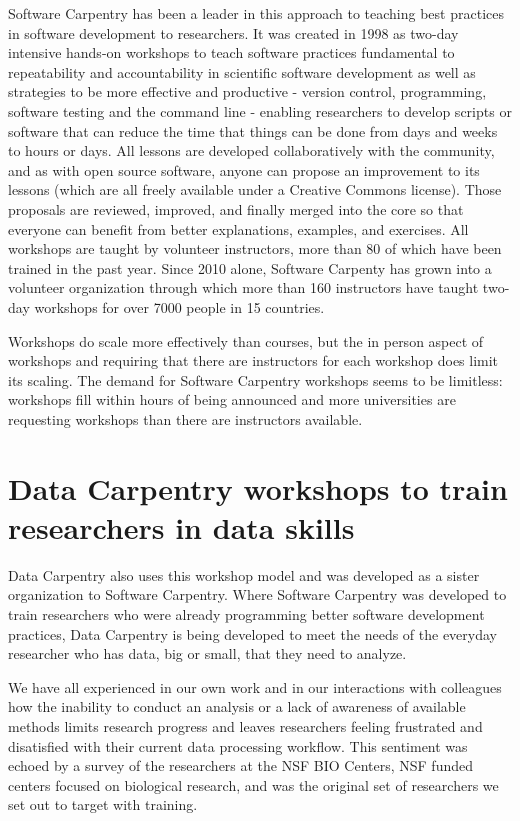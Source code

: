 \documentclass[15]{idcc}
\begin{document}
Software Carpentry has been a leader in this approach to teaching best practices in software development to researchers. It was created in 1998 as two-day
intensive hands-on workshops to teach software practices fundamental to repeatability and accountability in scientific software
development as well as strategies to be more effective and productive - version control, programming, software testing and the command
line - enabling researchers to develop scripts or software that can reduce the time that things can be done from days and weeks to hours
or days. All lessons are developed
collaboratively with the community, and as with open source software, anyone can propose an improvement to its lessons (which are all
freely available under a Creative Commons license).  Those proposals are reviewed, improved, and finally merged into the core so that
everyone can benefit from better explanations, examples, and exercises. All workshops are taught by volunteer instructors, more than 80
of which have been trained in the past year. Since 2010 alone, Software Carpenty has grown into a volunteer organization through which more than 160 instructors have
taught two-day workshops for over 7000 people in 15 countries.

Workshops do scale more effectively than courses, but the in person aspect of workshops and requiring that there are instructors
 for each workshop does limit its scaling. The demand for Software Carpentry workshops seems to be limitless:  workshops
fill within hours of being announced and more universities are requesting workshops than there are instructors available.

\section{Data Carpentry workshops to train researchers in data skills}

Data Carpentry also uses this workshop model and was developed as a sister organization to Software Carpentry. Where Software
Carpentry was developed to train researchers who were already programming better software development practices, Data Carpentry is
being developed to meet the needs of the everyday researcher who has data, big or small,
that they need to analyze.

We have all experienced in our own work and
in our interactions with colleagues how the inability to conduct an analysis or a lack of awareness of available
methods limits research progress and leaves researchers feeling frustrated and disatisfied with their current data processing workflow. This
sentiment was echoed by a survey of the researchers at the NSF BIO Centers, NSF funded centers focused on biological research, and
was the original set of researchers we set out to target with training.
\end{document}
